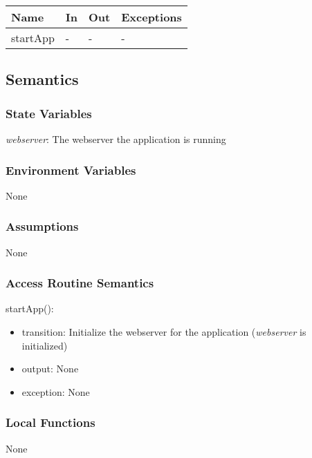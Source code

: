 \documentclass[12pt, titlepage]{article}
\begin{document}
\begin{center}
\begin{tabular}{p{2cm} p{4cm} p{4cm} p{2cm}}
\hline
\textbf{Name} & \textbf{In} & \textbf{Out} & \textbf{Exceptions} \\
\hline
startApp & - & - & - \\
\hline
\end{tabular}
\end{center}

\subsection{Semantics}

\subsubsection{State Variables}

\textit{webserver}: The webserver the application is running

\subsubsection{Environment Variables}

None

\subsubsection{Assumptions}

None

\subsubsection{Access Routine Semantics}

\noindent startApp():
\begin{itemize}
\item transition: Initialize the webserver for the application (\textit{webserver} is initialized)
\item output: None
\item exception: None
\end{itemize}

\subsubsection{Local Functions}

None

\newpage
\end{document}
